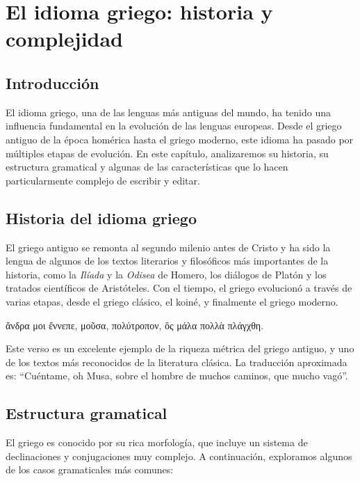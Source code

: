 \chapter{El idioma griego: historia y complejidad}

\section{Introducción}

El idioma griego, una de las lenguas más antiguas del mundo, ha tenido una influencia fundamental en la evolución de las lenguas europeas. Desde el griego antiguo de la época homérica hasta el griego moderno, este idioma ha pasado por múltiples etapas de evolución. En este capítulo, analizaremos su historia, su estructura gramatical y algunas de las características que lo hacen particularmente complejo de escribir y editar.

\section{Historia del idioma griego}

El griego antiguo se remonta al segundo milenio antes de Cristo y ha sido la lengua de algunos de los textos literarios y filosóficos más importantes de la historia, como la \textit{Ilíada} y la \textit{Odisea} de Homero, los diálogos de Platón y los tratados científicos de Aristóteles. Con el tiempo, el griego evolucionó a través de varias etapas, desde el griego clásico, el koiné, y finalmente el griego moderno.

ἄνδρα μοι ἔννεπε, μοῦσα, πολύτροπον, ὃς μάλα πολλὰ πλάγχθη.

Este verso es un excelente ejemplo de la riqueza métrica del griego antiguo, y uno de los textos más reconocidos de la literatura clásica. La traducción aproximada es: \enquote{Cuéntame, oh Musa, sobre el hombre de muchos caminos, que mucho vagó}.

\section{Estructura gramatical}

El griego es conocido por su rica morfología, que incluye un sistema de declinaciones y conjugaciones muy complejo. A continuación, exploramos algunos de los casos gramaticales más comunes:

